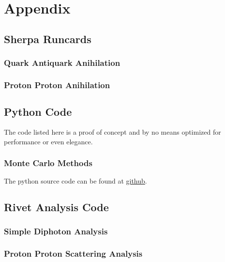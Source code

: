 \chapter{Appendix}%
\label{chap:appendix}

\section{Sherpa Runcards}%
\label{sec:runcards}

\subsection{Quark Antiquark Anihilation}%
\label{sec:qqggruncard}

\subsection{Proton Proton Anihilation}%
\label{sec:ppruncard}

\section{Python Code}%
\label{sec:pycode}
The code listed here is a proof of concept and by no means optimized
for performance or even elegance.

\subsection{Monte Carlo Methods}%
\label{sec:mcpy}
The python source code can be found at
\href{https://github.com/vale981/bachelor_thesis/blob/master/prog/python/qqgg/monte_carlo.py}{github}.

\section{Rivet Analysis Code}%
\label{sec:rivetcode}

\subsection{Simple Diphoton Analysis}%
\label{sec:simpdiphotriv}

\subsection{Proton Proton Scattering Analysis}%
\label{sec:ppanalysis}

